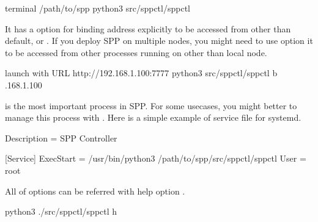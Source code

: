 \documentclass[a4paper,11pt,openany,oneside,english]{sphinxmanual}
\begin{document}
\begin{sphinxVerbatim}[commandchars=\\\{\},formatcom=\footnotesize]
 terminal 
  /path/to/spp
 python3 src/spp\PYGZhy{}ctl/spp\PYGZhy{}ctl
\end{sphinxVerbatim}

It has a option  for binding address explicitly to be accessed
from other than default,  or .
If you deploy SPP on multiple nodes, you might need to use  option
it to be accessed from other processes running on other than local node.

\begin{sphinxVerbatim}[commandchars=\\\{\},formatcom=\footnotesize]
 launch with URL http://192.168.1.100:7777
 python3 src/spp\PYGZhy{}ctl/spp\PYGZhy{}ctl \PYGZhy{}b .168.1.100
\end{sphinxVerbatim}

 is the most important process in SPP. For some usecases,
you might better to manage this process with .
Here is a simple example of service file for systemd.

\begin{sphinxVerbatim}[commandchars=\\\{\},formatcom=\footnotesize]
[Unit]
Description = SPP Controller

[Service]
ExecStart = /usr/bin/python3 /path/to/spp/src/spp\PYGZhy{}ctl/spp\PYGZhy{}ctl
User = root
\end{sphinxVerbatim}

All of options can be referred with help option .

\begin{sphinxVerbatim}[commandchars=\\\{\},formatcom=\footnotesize]
 python3 ./src/spp\PYGZhy{}ctl/spp\PYGZhy{}ctl \PYGZhy{}h


\end{sphinxVerbatim}
\end{document}
